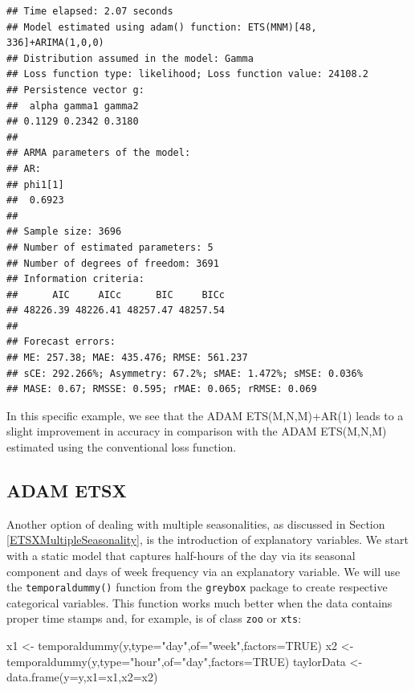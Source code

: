 \documentclass[
]{book}
\newenvironment{Shaded}{\begin{snugshade}}{\end{snugshade}}
\newcommand{\AttributeTok}[1]{\textcolor[rgb]{0.77,0.63,0.00}{#1}}
\newcommand{\ConstantTok}[1]{\textcolor[rgb]{0.00,0.00,0.00}{#1}}
\newcommand{\FunctionTok}[1]{\textcolor[rgb]{0.00,0.00,0.00}{#1}}
\newcommand{\NormalTok}[1]{#1}
\newcommand{\OtherTok}[1]{\textcolor[rgb]{0.56,0.35,0.01}{#1}}
\newcommand{\StringTok}[1]{\textcolor[rgb]{0.31,0.60,0.02}{#1}}
\theoremstyle{definition}
\theoremstyle{definition}
\theoremstyle{definition}
\theoremstyle{definition}
\theoremstyle{remark}
\begin{document}
\begin{verbatim}
## Time elapsed: 2.07 seconds
## Model estimated using adam() function: ETS(MNM)[48, 336]+ARIMA(1,0,0)
## Distribution assumed in the model: Gamma
## Loss function type: likelihood; Loss function value: 24108.2
## Persistence vector g:
##  alpha gamma1 gamma2 
## 0.1129 0.2342 0.3180 
## 
## ARMA parameters of the model:
## AR:
## phi1[1] 
##  0.6923 
## 
## Sample size: 3696
## Number of estimated parameters: 5
## Number of degrees of freedom: 3691
## Information criteria:
##      AIC     AICc      BIC     BICc 
## 48226.39 48226.41 48257.47 48257.54 
## 
## Forecast errors:
## ME: 257.38; MAE: 435.476; RMSE: 561.237
## sCE: 292.266%; Asymmetry: 67.2%; sMAE: 1.472%; sMSE: 0.036%
## MASE: 0.67; RMSSE: 0.595; rMAE: 0.065; rRMSE: 0.069
\end{verbatim}

In this specific example, we see that the ADAM ETS(M,N,M)+AR(1) leads to a slight improvement in accuracy in comparison with the ADAM ETS(M,N,M) estimated using the conventional loss function.

\hypertarget{adam-etsx}{%
\subsection{ADAM ETSX}\label{adam-etsx}}

Another option of dealing with multiple seasonalities, as discussed in Section \ref{ETSXMultipleSeasonality}, is the introduction of explanatory variables. We start with a static model that captures half-hours of the day via its seasonal component and days of week frequency via an explanatory variable. We will use the \texttt{temporaldummy()} function from the \texttt{greybox} package to create respective categorical variables. This function works much better when the data contains proper time stamps and, for example, is of class \texttt{zoo} or \texttt{xts}:

\begin{Shaded}
\begin{Highlighting}[]
\NormalTok{x1 }\OtherTok{\textless{}{-}} \FunctionTok{temporaldummy}\NormalTok{(y,}\AttributeTok{type=}\StringTok{"day"}\NormalTok{,}\AttributeTok{of=}\StringTok{"week"}\NormalTok{,}\AttributeTok{factors=}\ConstantTok{TRUE}\NormalTok{)}
\NormalTok{x2 }\OtherTok{\textless{}{-}} \FunctionTok{temporaldummy}\NormalTok{(y,}\AttributeTok{type=}\StringTok{"hour"}\NormalTok{,}\AttributeTok{of=}\StringTok{"day"}\NormalTok{,}\AttributeTok{factors=}\ConstantTok{TRUE}\NormalTok{)}
\NormalTok{taylorData }\OtherTok{\textless{}{-}} \FunctionTok{data.frame}\NormalTok{(}\AttributeTok{y=}\NormalTok{y,}\AttributeTok{x1=}\NormalTok{x1,}\AttributeTok{x2=}\NormalTok{x2)}
\end{Highlighting}
\end{Shaded}
\end{document}
